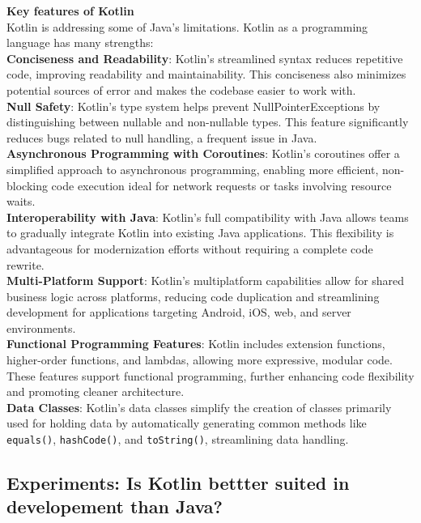 \noindent \textbf{Key features of Kotlin}
\\
\noindent Kotlin is addressing some of Java's limitations. Kotlin as a programming language has many strengths:
\\
\textbf{Conciseness and Readability}: Kotlin’s streamlined syntax reduces repetitive code, improving readability and maintainability. This conciseness also minimizes potential sources of error and makes the codebase easier to work with.
\\
\textbf{Null Safety}: Kotlin’s type system helps prevent NullPointerExceptions by distinguishing between nullable and non-nullable types. This feature significantly reduces bugs related to null handling, a frequent issue in Java.
\\
\textbf{Asynchronous Programming with Coroutines}: Kotlin’s coroutines offer a simplified approach to asynchronous programming, enabling more efficient, non-blocking code execution ideal for network requests or tasks involving resource waits.
\\
\textbf{Interoperability with Java}: Kotlin’s full compatibility with Java allows teams to gradually integrate Kotlin into existing Java applications. This flexibility is advantageous for modernization efforts without requiring a complete code rewrite.
\\
\textbf{Multi-Platform Support}: Kotlin’s multiplatform capabilities allow for shared business logic across platforms, reducing code duplication and streamlining development for applications targeting Android, iOS, web, and server environments.
\\
\textbf{Functional Programming Features}: Kotlin includes extension functions, higher-order functions, and lambdas, allowing more expressive, modular code. These features support functional programming, further enhancing code flexibility and promoting cleaner architecture.
\\
\textbf{Data Classes}: Kotlin’s data classes simplify the creation of classes primarily used for holding data by automatically generating common methods like \texttt{equals()}, \texttt{hashCode()}, and \texttt{toString()}, streamlining data handling.


\subsection{Experiments: Is Kotlin bettter suited in developement than Java? }

